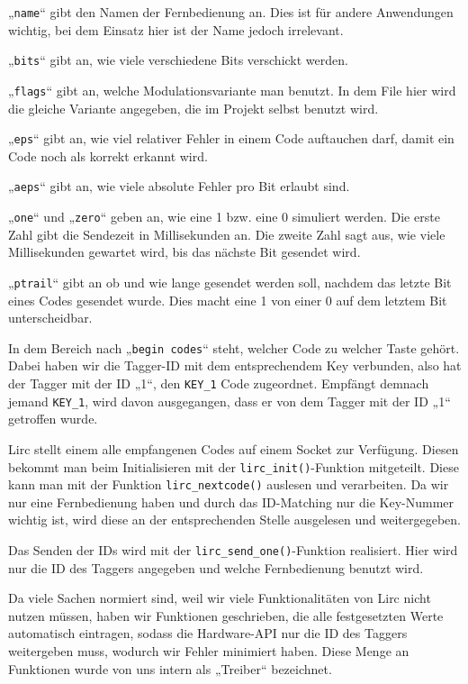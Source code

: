 „\texttt{name}“ gibt den Namen der Fernbedienung an. Dies ist für andere Anwendungen wichtig,
bei dem Einsatz hier ist der Name jedoch irrelevant.

„\texttt{bits}“ gibt an, wie viele verschiedene Bits verschickt werden.

„\texttt{flags}“ gibt an, welche Modulationsvariante man benutzt. In dem File hier wird die gleiche Variante angegeben,
die im Projekt selbst benutzt wird.

„\texttt{eps}“ gibt an, wie viel relativer Fehler in einem Code auftauchen darf, damit ein Code noch als korrekt erkannt wird.

„\texttt{aeps}“ gibt an, wie viele absolute Fehler pro Bit erlaubt sind.

„\texttt{one}“ und „\texttt{zero}“ geben an, wie eine 1 bzw. eine 0 simuliert werden.
Die erste Zahl gibt die Sendezeit in Millisekunden an. Die zweite Zahl sagt aus, wie viele Millisekunden gewartet wird,
bis das nächste Bit gesendet wird.

„\texttt{ptrail}“ gibt an ob und wie lange gesendet werden soll, nachdem das letzte Bit eines Codes gesendet wurde. 
Dies macht eine 1 von einer 0 auf dem letztem Bit unterscheidbar.

In dem Bereich nach „\texttt{begin codes}“ steht, welcher Code zu welcher Taste gehört. Dabei haben wir die Tagger-ID mit dem
entsprechendem Key verbunden, also hat der Tagger mit der ID „1“, den \texttt{KEY_1} Code zugeordnet. Empfängt demnach
jemand \texttt{KEY_1}, wird davon ausgegangen, dass er von dem Tagger mit der ID „1“ getroffen wurde.

Lirc stellt einem alle empfangenen Codes auf einem Socket zur Verfügung. Diesen bekommt man beim Initialisieren mit der
\texttt{lirc\_init()}-Funktion mitgeteilt.
Diese kann man mit der Funktion \texttt{lirc\_nextcode()} auslesen und verarbeiten. Da wir nur eine Fernbedienung haben
und durch das ID-Matching nur die Key-Nummer wichtig ist, wird diese an der entsprechenden Stelle ausgelesen und weitergegeben.

Das Senden der IDs wird mit der \texttt{lirc\_send\_one()}-Funktion realisiert. Hier wird nur die ID des Taggers angegeben
und welche Fernbedienung benutzt wird.

Da viele Sachen normiert sind, weil wir viele Funktionalitäten von Lirc nicht nutzen müssen, haben wir Funktionen geschrieben,
die alle festgesetzten Werte automatisch eintragen, sodass die Hardware-API nur die ID des Taggers weitergeben muss,
wodurch wir Fehler minimiert haben. Diese Menge an Funktionen wurde von uns intern als „Treiber“ bezeichnet.
